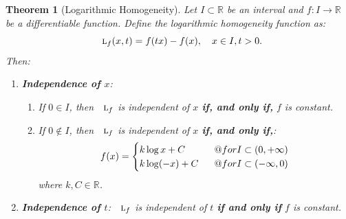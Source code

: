 \documentclass{amsart}
\makeatletter
\newtheorem{theorem}{Theorem}
\theoremstyle{plain}
\numberwithin{equation}{section}
\def\RIfM@{\relax\ifmmode}%
\def\RIfM@{\relax\protect\ifmmode}
\def\text{\RIfM@\expandafter\text@\else\expandafter\mbox\fi}
\def\text@#1{\mathchoice
   {\textdef@\displaystyle\f@size{#1}}%
   {\textdef@\textstyle\tf@size{\firstchoice@false #1}}%
   {\textdef@\textstyle\sf@size{\firstchoice@false #1}}%
   {\textdef@\textstyle \ssf@size{\firstchoice@false #1}}%
   \glb@settings}
\def\textdef@#1#2#3{\hbox{{%
                    \everymath{#1}%
                    \let\f@size#2\selectfont
                    #3}}}
\newif\iffirstchoice@
\makeatother
\begin{document}
\begin{theorem}[Logarithmic Homogeneity]
Let $I \subset \mathbb{R}$ be an interval and $f: I \to \mathbb{R}$ be a differentiable function. Define the \emph{logarithmic homogeneity function} as:
\[
\textsc{l}_f (x, t) = f(tx) - f(x), \quad x \in I, t > 0.
\]
Then:

\begin{enumerate}
    \item \textbf{Independence of $x$}:
    \begin{enumerate}
        \item If $0 \in I$, then $\textsc{l}_f$ is independent of $x$ \textbf{if, and only if,} $f$ is constant.
        \item If $0 \notin I$, then $\textsc{l}_f$ is independent of $x$ \textbf{if, and only if,}:
        \[
        f(x) = 
        \begin{cases}
        k\log x + C & \text{for } I \subset (0, +\infty) \\
        k\log(-x) + C & \text{for } I \subset (-\infty, 0)
        \end{cases}
        \]
        where $k, C \in \mathbb{R}$.
    \end{enumerate}
    
    \item \textbf{Independence of $t$}: 
    $\textsc{l}_f$ is independent of $t$ \textbf{if and only if} $f$ is constant.
\end{enumerate}
\end{theorem}
\end{document}
